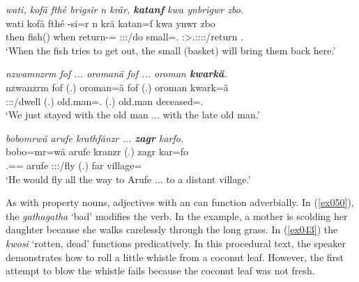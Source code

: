 \begin{exe}
	\ex \emph{wati, kofä fthé brigsir n krär, \textbf{katanf} kwa ynbrigwr zbo.}\\
	\gll wati kofä fthé -si=r n krä katan=f kwa ynwr zbo\\
	then fish(\Abs{}) when return-\Nmlz=\Purp{} \Imn{} \Stsg:\Sbj:\Irr:\Pfv/do small=\Erg.\Sg{} \Fut{} \Stsg:\Sbj>\Tsg.\Masc:\Obj:\Nonpast:\Ipfv:\Venit/return \Prox{}.\All{}\\
	\trans `When the fish tries to get out, the small (basket) will bring them back here.'
	\label{ex048}
\end{exe}
\begin{exe}
	\ex \emph{nzwamnzrm fof ... oromanä fof ... oroman \textbf{kwarkä}.}\\
	\gll nzwanzrm fof (.) oroman=ä fof (.) oroman kwark=ä\\
	\Fsg:\Sbj:\Pst:\Dur/dwell \Emph{} (.) {old.man=\Assoc.\Pl} \Emph{} (.) {old.man} deceased=\Assoc.\Pl{}\\
	\trans `We just stayed with the old man ... with the late old man.'\\
	\label{ex049}
\end{exe}
\begin{exe}
	\ex \emph{bobomrwä arufe krathfänzr ... \textbf{zagr} karfo.}\\
	\gll bobo=mr=wä arufe kranzr (.) zagr kar=fo\\
	\Med.\All=\Purp=\Emph{} arufe \Stsg:\Sbj:\Irr:\Ipfv/fly (.) far village=\All\\
	\trans `He would fly all the way to Arufe ... to a distant village.'\\
	\label{ex505}
\end{exe}

As with property nouns, adjectives with an   can function adverbially. In (\ref{ex050}), the  \emph{gathagatha} `bad' modifies the verb. In the example, a mother is scolding her daughter because she walks carelessly through the long grass. In (\ref{ex043}) the  \emph{kwosi} `rotten, dead' functions predicatively. In this procedural text, the speaker demonstrates how to roll a little whistle from a coconut leaf. However, the first attempt to blow the whistle fails because the coconut leaf was not fresh.

